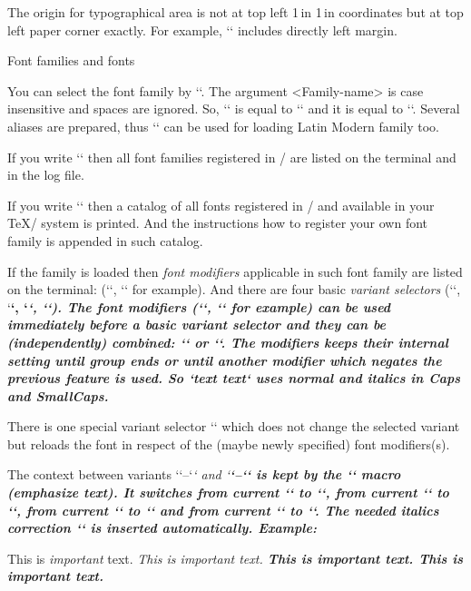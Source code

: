 \new
The origin for typographical area is not at top left 1\,in 1\,in coordinates
but at top left paper corner exactly. For example, `\hoffset` includes directly left
margin.


\sec Font families and fonts

You can select the font family by ``.
The argument <Family-name> is case insensitive and spaces are ignored. So,
`\fontfam[LM Fonts]` is equal to `\fontfam[LMfonts]` and it is equal
to `\fontfam[lmfonts]`. Several aliases are prepared, thus 
`` can be used for loading Latin Modern family too.

If you write `\fontfam[?]` then all font families registered in \OpTeX/ 
are listed on the terminal and in the log file.

If you write `\fontfam[catalog]` then a catalog of all fonts registered in
\OpTeX/ and available in your \TeX/ system is printed. And the instructions
how to register your own font family is appended in such catalog.

If the family is loaded then {\em font modifiers} applicable in such font family
are listed on the terminal: (`\caps`, `\cond` for example).
And there are four basic {\em variant selectors} (`\rm`, `\bf`, `\it`, `\bi`).
The font modifiers (`\caps`, `\cond` for example) can
be used immediately before a basic variant selector and they
can be (independently) combined: `\caps\it` or `\cond\caps\bf`. The
modifiers keeps their internal setting until group ends or until another
modifier which negates the previous feature is used. So
`\caps \rm text \it text`  uses normal and italics in Caps and SmallCaps.

\new
There is one special variant selector `\currvar` which does not change the
selected variant but reloads the font in respect of the (maybe newly
specified) font modifiers(s).

The context between variants `\rm`--`\it` and `\bf`--`\bi` is kept by the `\em`
macro (emphasize text).  
It switches from current `\rm` to `\it`, from current `\it` to `\rm`, from
current `\bf` to `\bi` and from current `\bi` to `\bf`.
The needed italics correction `\/` is inserted automatically. Example:

\begtt
This is {\em important} text.     %
\it This is {\em important} text. %
\bf This is {\em important} text. %
\bi This is {\em important} text. %
\endtt

